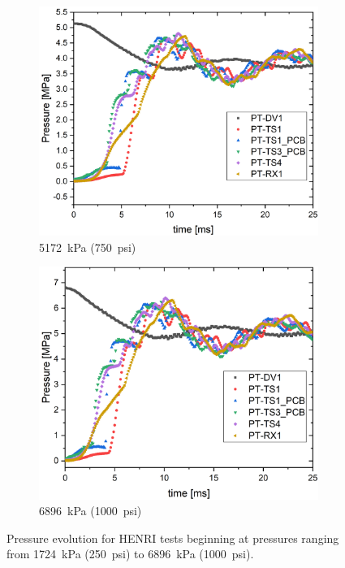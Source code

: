 \begin{figure}[htbp]
    \begin{subfigure}{0.49\textwidth}
        \includegraphics[width=\textwidth]{results/plots/750psi_Mpa_25.png}
        \caption{\SI{5172}{\kilo\pascal} (\SI{750}{psi})}
        \label{fig:piston multi 750}
    \end{subfigure}
    \hfill
    \begin{subfigure}{0.49\textwidth}
        \includegraphics[width=\textwidth]{results/plots/1000psi_Mpa_25.png}
        \caption{\SI{6896}{\kilo\pascal} (\SI{1000}{psi})}
        \label{fig:piston multi 1000}
    \end{subfigure}

    \caption{Pressure evolution for HENRI tests beginning at pressures ranging from \SI{1724}{\kilo\pascal} (\SI{250}{psi}) to \SI{6896}{\kilo\pascal} (\SI{1000}{psi}).}
    \label{fig:piston multi}
    \vspace{16pt}
\end{figure}

